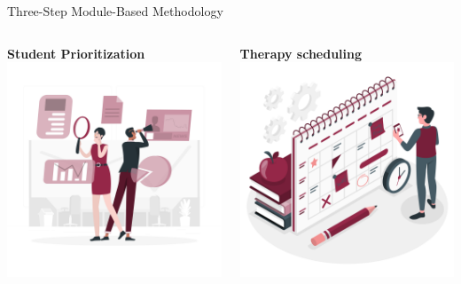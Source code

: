 \documentclass[10pt, xcolor=table]{beamer}
\begin{document}
\begin{frame}{Three-Step Module-Based Methodology}
\begin{columns}[c]
		\centering
		\textbf{Student Prioritization} \\
		\includegraphics[width=\linewidth]{./figures/priorizing.png}
		
		\centering
		\textbf{Therapy scheduling} \\
		\includegraphics[width=\linewidth]{./figures/schedule.png}
	\end{columns}
\end{frame}
\end{document}
